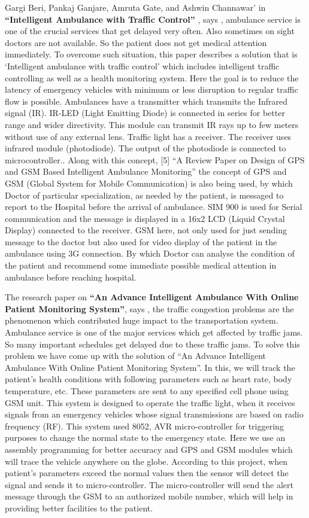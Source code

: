 \documentclass[12pt,a4paper,oneside,openright]{report}
\begin{document}
Gargi Beri, Pankaj Ganjare, Amruta Gate, and Ashwin Channawar’ in \textbf{“Intelligent Ambulance with Traffic Control”} , says , ambulance service is one of the crucial services that get delayed very often. Also sometimes on sight doctors are not available. So the patient does not get medical attention immediately. To overcome such situation, this paper describes a solution that is ‘Intelligent ambulance with traffic control’ which includes intelligent traffic controlling as well as a health monitoring system. Here the goal is to reduce the latency of emergency vehicles with minimum or less disruption to regular traffic flow is possible. Ambulances have a transmitter which transmits the Infrared signal (IR). IR-LED (Light Emitting Diode) is connected in series for better range and wider directivity. This module can transmit IR rays up to few meters without use of any external lens. Traffic light has a receiver. The receiver uses infrared module (photodiode). The output of the photodiode is connected to microcontroller.. Along with this concept, [5] “A Review Paper on Design of GPS and GSM Based Intelligent Ambulance Monitoring” the concept of GPS and  GSM (Global System for Mobile Communication) is also being used, by which Doctor of particular specialization, as needed by the patient, is messaged to report to the Hospital before the arrival of ambulance. SIM 900 is used for Serial communication and the message is displayed in a 16x2 LCD (Liquid Crystal Display) connected to the receiver. GSM here, not only used for just sending message to the doctor but also used for video display of the patient in the ambulance using 3G connection. By which Doctor can analyse the condition of the patient and recommend some immediate possible medical attention in ambulance before reaching hospital.

The research paper on \textbf{“An Advance Intelligent Ambulance With Online Patient Monitoring System”}, says , the traffic congestion problems are the phenomenon which contributed huge impact to the transportation system. Ambulance service is one of the major services which get affected by traffic jams. So many important schedules get delayed due to these traffic jams. To solve this problem we have come up with the solution of “An Advance Intelligent Ambulance With Online Patient Monitoring System”. In this, we will track the patient’s health conditions with following parameters such as heart rate, body temperature, etc. These parameters are sent to any specified cell phone using GSM unit. This system is designed to operate the traffic light, when it receives signals from an emergency vehicles whose signal transmissions are based on radio frequency (RF). This system used 8052, AVR micro-controller for triggering purposes to change the normal state to the emergency state. Here we use an assembly programming for better accuracy and GPS and GSM modules which will trace the vehicle anywhere on the globe. According to this project, when patient’s parameters exceed the normal values then the sensor will detect the signal and sends it to micro-controller. The micro-controller will send the alert message through the GSM to an authorized mobile number, which will help in providing better facilities to the patient.
\end{document}
